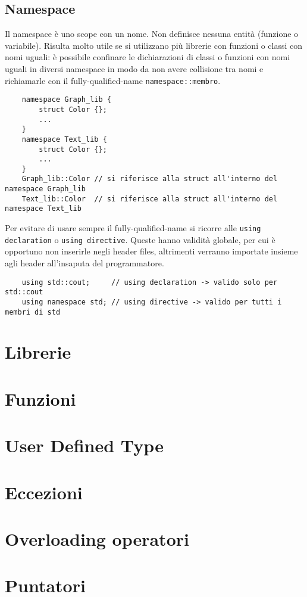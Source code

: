 \documentclass[a4paper]{article}
\begin{document}
\subsection{Namespace}
Il namespace è uno scope con un nome. Non definisce nessuna entità (funzione o variabile). Risulta molto utile se si utilizzano
più librerie con funzioni o classi con nomi uguali: è possibile confinare le dichiarazioni di classi o funzioni con nomi uguali
in diversi namespace in modo da non avere collisione tra nomi e richiamarle con il fully-qualified-name \verb|namespace::membro|.
\begin{lstlisting}
	namespace Graph_lib {
		struct Color {};
		...
	}
	namespace Text_lib {
		struct Color {};
		...
	}
	Graph_lib::Color // si riferisce alla struct all'interno del namespace Graph_lib
	Text_lib::Color  // si riferisce alla struct all'interno del namespace Text_lib
\end{lstlisting}
Per evitare di usare sempre il fully-qualified-name si ricorre alle \verb|using declaration| o \verb|using directive|. Queste
hanno validità globale, per cui è opportuno non inserirle negli header files, altrimenti verranno importate insieme agli header
all'insaputa del programmatore.
\begin{lstlisting}
	using std::cout;     // using declaration -> valido solo per std::cout
	using namespace std; // using directive -> valido per tutti i membri di std
\end{lstlisting}

\section{Librerie}
\section{Funzioni}
\section{User Defined Type}
\section{Eccezioni}
\section{Overloading operatori}
\section{Puntatori}
\end{document}
